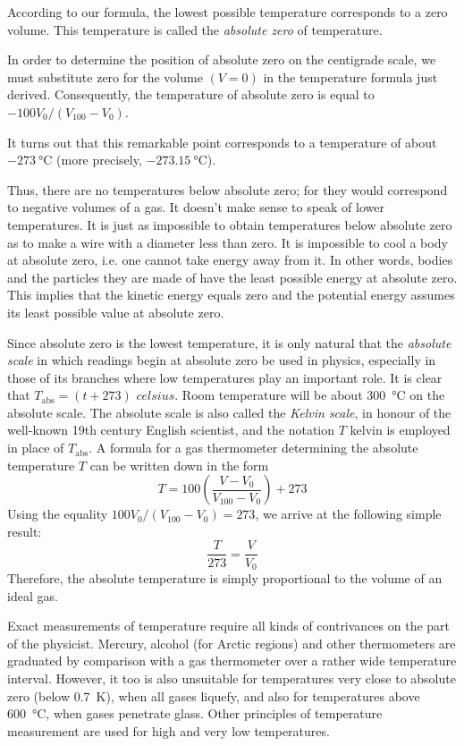 According to our formula, the lowest possible tempera­ture corresponds to a zero volume. This temperature is called the \emph{absolute zero} of temperature.

In order to determine the position of absolute zero on the centigrade scale, we must substitute zero for the vol­ume $(V = 0)$ in the temperature formula just derived. Consequently, the temperature of absolute zero is equal to $-100V_{0}/(V_{100}- V_{0})$.

It turns out that this remarkable point corresponds to a temperature of about $\SI{-273}{\celsius}$ (more precisely, $\SI{-273.15}{\celsius}$). 

Thus, there are no temperatures below absolute zero; for they would correspond to negative volumes of a gas. It doesn’t make sense to speak of lower temperatures. It is just as impossible to obtain temperatures below abso­lute zero as to make a wire with a diameter less than zero. It is impossible to cool a body at absolute zero, i.e. one cannot take energy away from it. In other words, bodies and the particles they are made of have the least possible energy at absolute zero. This implies that the kinetic energy equals zero and the potential energy as­sumes its least possible value at absolute zero.

Since absolute zero is the lowest temperature, it is only natural that the \emph{absolute scale} in which readings begin at absolute zero be used in physics, especially in those of its branches where low temperatures play an important role. It is clear that $T_{\text{abs}}  = (t + 273)\,\, \si{celsius}$. Room temperature will be about \SI{300}{\celsius} on the absolute scale. The absolute scale is also called the \emph{Kelvin scale}, in honour of the well-known 19th century English scien­tist, and the notation $T$ \si{kelvin} is employed in place of $T_{\text{abs}}$. A formula for a gas thermometer determining the abso­lute temperature $T$ can be written down in the form 
\begin{equation*}%
T = 100 \left(  \frac{V - V_{0}}{V_{100}-V_{0}} \right) + 273
\end{equation*}
Using the equality $100V_{0}/(V_{100}-V_{0}) = 273$, we arrive at the following simple result:
\begin{equation*}%
\frac{T}{273} = \frac{V}{V_{0}}
\end{equation*}
Therefore, the absolute temperature is simply proportion­al to the volume of an ideal gas.

Exact measurements of temperature require all kinds of contrivances on the part of the physicist. Mercury, al­cohol (for Arctic regions) and other thermometers are graduated by comparison with a gas thermometer over a rather wide temperature interval. However, it too is also unsuitable for temperatures very close to absolute zero (below \SI{0.7}{\kelvin}), when all gases liquefy, and also for temperatures above \SI{600}{\celsius}, when gases penetrate glass. Other principles of temperature measurement are used for high and very low temperatures.

